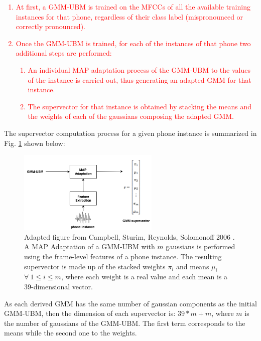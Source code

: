 \textcolor{red}{
  \begin{enumerate}
    \item At first, a GMM-UBM is trained on the MFCCs
    of all the available training instances for that phone, regardless of their class
    label (mispronounced or correctly pronounced).
    \item Once the GMM-UBM is trained, for each of the instances of
    that phone two additional steps are performed:
      \begin{enumerate}
        \item An individual MAP adaptation process of the GMM-UBM to the values of
        the instance is carried out, thus generating an adapted GMM for that instance.
        \item The supervector for that instance
        is obtained by stacking the means and the weights of each of the
        gaussians composing the adapted GMM.
      \end{enumerate}
  \end{enumerate}
}

The supervector computation process for a given phone instance
is summarized in Fig. \ref{fig:supervectors_extraction} shown below:

\begin{figure}[H]
  \centering
  \includegraphics[width=0.6\textwidth]{files/figures/method/supervectors_extraction}
  \caption{
    Adapted figure from Campbell, Sturim, Reynolds, Solomonoff 2006 \cite{supervectors}.
    A MAP Adaptation of a GMM-UBM with $m$ gaussians
    is performed using the frame-level features of a phone instance.
    The resulting supervector is made up of the stacked weights $\pi_{i}$ and means
    $\mu_{i}$ $\forall \ 1 \leq i \leq m$, where each weight is a real value and each
    mean is a 39-dimensional vector.
  }
  \label{fig:supervectors_extraction}
\end{figure}

As each derived GMM has the same number of gaussian components as the initial GMM-UBM,
then the dimension
of each supervector is: $39*m + m$, where $m$ is the number of gaussians of the GMM-UBM. The
first term corresponds to the means while the second one to the weights.

